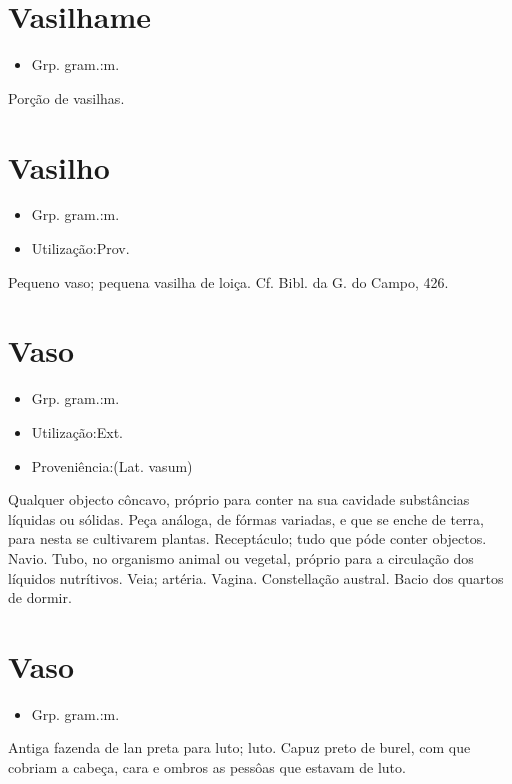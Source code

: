 \documentclass{article}
\begin{document}
\section{Vasilhame}
\begin{itemize}
\item {Grp. gram.:m.}
\end{itemize}
Porção de vasilhas.
\section{Vasilho}
\begin{itemize}
\item {Grp. gram.:m.}
\end{itemize}
\begin{itemize}
\item {Utilização:Prov.}
\end{itemize}
Pequeno vaso; pequena vasilha de loiça. Cf. \textunderscore Bibl. da G. do Campo\textunderscore , 426.
\section{Vaso}
\begin{itemize}
\item {Grp. gram.:m.}
\end{itemize}
\begin{itemize}
\item {Utilização:Ext.}
\end{itemize}
\begin{itemize}
\item {Proveniência:(Lat. \textunderscore vasum\textunderscore )}
\end{itemize}
Qualquer objecto côncavo, próprio para conter na sua cavidade substâncias líquidas ou sólidas.
Peça análoga, de fórmas variadas, e que se enche de terra, para nesta se cultivarem plantas.
Receptáculo; tudo que póde conter objectos.
Navio.
Tubo, no organismo animal ou vegetal, próprio para a circulação dos líquidos nutrítivos.
Veia; artéria.
Vagina.
Constellação austral.
Bacio dos quartos de dormir.
\section{Vaso}
\begin{itemize}
\item {Grp. gram.:m.}
\end{itemize}
Antiga fazenda de lan preta para luto; luto.
Capuz preto de burel, com que cobriam a cabeça, cara e ombros as pessôas que estavam de luto.
\end{document}
